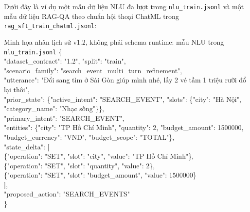 Dưới đây là ví dụ một mẫu dữ liệu NLU đa lượt trong \texttt{nlu\_train.jsonl} và một mẫu dữ liệu RAG-QA theo chuẩn hội thoại ChatML trong \texttt{rag\_\allowbreak sft\_\allowbreak train\_\allowbreak chatml.jsonl}:

\begin{databox}{Minh họa nhãn lịch sử v1.2, không phải schema runtime: mẫu NLU trong \texttt{nlu\_train.jsonl}}
\footnotesize\ttfamily
\{\\
\hspace*{1em}"dataset\_contract": "1.2", "split": "train",\\
\hspace*{1em}"scenario\_family": "search\_event\_multi\_turn\_refinement",\\
\hspace*{1em}"utterance": "Đổi sang tìm ở Sài Gòn giúp mình nhé, lấy 2 vé tầm 1 triệu rưỡi đổ lại thôi",\\
\hspace*{1em}"prior\_state": \{"active\_intent": "SEARCH\_EVENT", "slots": \{"city": "Hà Nội", "category\_name": "Nhạc sống"\}\},\\
\hspace*{1em}"primary\_intent": "SEARCH\_EVENT",\\
\hspace*{1em}"entities": \{"city": "TP Hồ Chí Minh", "quantity": 2, "budget\_amount": 1500000, "budget\_currency": "VND", "budget\_scope": "TOTAL"\},\\
\hspace*{1em}"state\_delta": [\\
\hspace*{2em}\{"operation": "SET", "slot": "city", "value": "TP Hồ Chí Minh"\},\\
\hspace*{2em}\{"operation": "SET", "slot": "quantity", "value": 2\},\\
\hspace*{2em}\{"operation": "SET", "slot": "budget\_amount", "value": 1500000\}\\
\hspace*{1em}],\\
\hspace*{1em}"proposed\_action": "SEARCH\_EVENTS"\\
\}
\end{databox}


